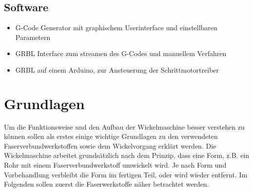 \documentclass[12pt, a4paper, ngerman]{article}
\begin{document}
\subsection{Software}
\begin{itemize}
    \item G-Code Generator mit graphischem Userinterface und einstellbaren Parametern
    \item GRBL Interface zum streamen des G-Codes und manuellem Verfahren
    \item GRBL auf einem Arduino, zur Ansteuerung der Schrittmotortreiber
\end{itemize}

\section{Grundlagen}
Um die Funktionsweise und den Aufbau der Wickelmaschine besser verstehen zu können sollen als erstes einige wichtige Grundlagen zu den verwendeten Faserverbundwerkstoffen sowie dem Wickelvorgang erklärt werden. Die Wickelmaschine arbeitet grundsätzlich nach dem Prinzip, dass eine Form, z.B. ein Rohr mit einem Faserverbundwerkstoff umwickelt wird. Je nach Form und Vorbehandlung verbleibt die Form im fertigen Teil, oder wird wieder entfernt. Im Folgenden sollen zuerst die Faserwerkstoffe näher betrachtet werden.
\end{document}
